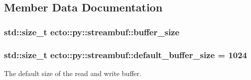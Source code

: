 \subsection{Member Data Documentation}
\hypertarget{classecto_1_1py_1_1streambuf_a8d60fa297a9140474d136a48342ac850}{
\subsubsection[{buffer\-\_\-size}]{\setlength{\rightskip}{0pt plus 5cm}std\-::size\-\_\-t ecto\-::py\-::streambuf\-::buffer\-\_\-size\hspace{0.3cm}{\ttfamily [private]}}}\label{classecto_1_1py_1_1streambuf_a8d60fa297a9140474d136a48342ac850}
\hypertarget{classecto_1_1py_1_1streambuf_a7a20a01fb9aeda8677b3c65bccd6b59d}{
\subsubsection[{default\-\_\-buffer\-\_\-size}]{\setlength{\rightskip}{0pt plus 5cm}std\-::size\-\_\-t ecto\-::py\-::streambuf\-::default\-\_\-buffer\-\_\-size = 1024\hspace{0.3cm}{\ttfamily [static]}}}\label{classecto_1_1py_1_1streambuf_a7a20a01fb9aeda8677b3c65bccd6b59d}


The default size of the read and write buffer. 

